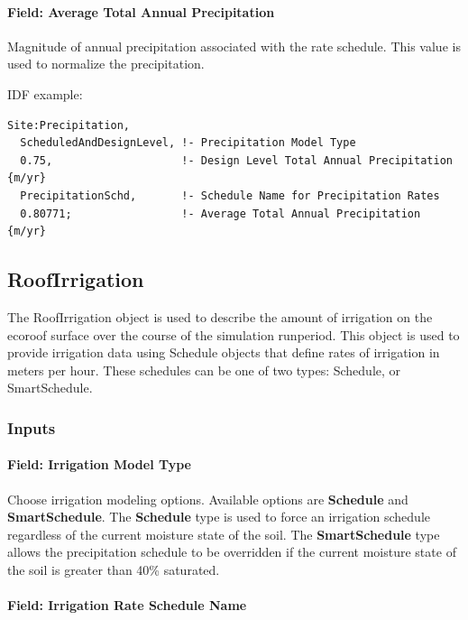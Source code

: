 \paragraph{Field: Average Total Annual Precipitation}\label{field-average-total-annual-precipitation}

Magnitude of annual precipitation associated with the rate schedule. This value is used to normalize the precipitation.

IDF example:

\begin{lstlisting}
Site:Precipitation,
  ScheduledAndDesignLevel, !- Precipitation Model Type
  0.75,                    !- Design Level Total Annual Precipitation {m/yr}
  PrecipitationSchd,       !- Schedule Name for Precipitation Rates
  0.80771;                 !- Average Total Annual Precipitation {m/yr}
\end{lstlisting}

\subsection{RoofIrrigation}\label{roofirrigation}

The RoofIrrigation object is used to describe the amount of irrigation on the ecoroof surface over the course of the simulation runperiod. This object is used to provide irrigation data using Schedule objects that define rates of irrigation in meters per hour. These schedules can be one of two types: Schedule, or SmartSchedule.

\subsubsection{Inputs}\label{inputs-23-002}

\paragraph{Field: Irrigation Model Type}\label{field-irrigation-model-type}

Choose irrigation modeling options. Available options are \textbf{Schedule} and \textbf{SmartSchedule}. The \textbf{Schedule} type is used to force an irrigation schedule regardless of the current moisture state of the soil. The \textbf{SmartSchedule} type allows the precipitation schedule to be overridden if the current moisture state of the soil is greater than 40\% saturated.

\paragraph{Field: Irrigation Rate Schedule Name}\label{field-irrigation-rate-schedule-name}

